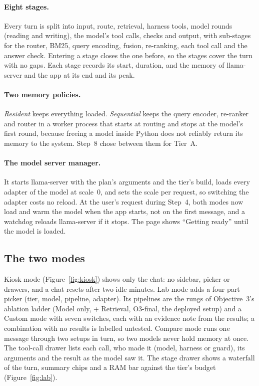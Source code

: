 \documentclass[11pt,a4paper]{article}
\begin{document}
\paragraph{Eight stages.} Every turn is split into input, route, retrieval, harness tools, model rounds (reading and
writing), the model's tool calls, checks and output, with sub-stages for the router, BM25, query encoding, fusion,
re-ranking, each tool call and the answer check. Entering a stage closes the one before, so the stages cover the turn
with no gaps. Each stage records its start, duration, and the memory of llama-server and the app at its end and its peak.

\paragraph{Two memory policies.} \emph{Resident} keeps everything loaded. \emph{Sequential} keeps the query encoder,
re-ranker and router in a worker process that starts at routing and stops at the model's first round, because freeing a
model inside Python does not reliably return its memory to the system. Step~8 chose between them for Tier~A.

\paragraph{The model server manager.} It starts llama-server with the plan's arguments and the tier's build, loads every
adapter of the model at scale~0, and sets the scale per request, so switching the adapter costs no reload. At the user's
request during Step~4, both modes now load and warm the model when the app starts, not on the first message, and a
watchdog reloads llama-server if it stops. The page shows ``Getting ready'' until the model is loaded.

\subsection{The two modes}
Kiosk mode (Figure~\ref{fig:kiosk}) shows only the chat: no sidebar, picker or drawers, and a chat resets after two idle
minutes. Lab mode adds a four-part picker (tier, model, pipeline, adapter). Its pipelines are the rungs of Objective~3's
ablation ladder (Model only, + Retrieval, O3-final, the deployed setup) and a Custom mode with seven switches, each with
an evidence note from the results; a combination with no results is labelled untested. Compare mode runs one message
through two setups in turn, so two models never hold memory at once. The tool-call drawer lists each call, who made it
(model, harness or guard), its arguments and the result as the model saw it. The stage drawer shows a waterfall of the
turn, summary chips and a RAM bar against the tier's budget (Figure~\ref{fig:lab}).
\end{document}
